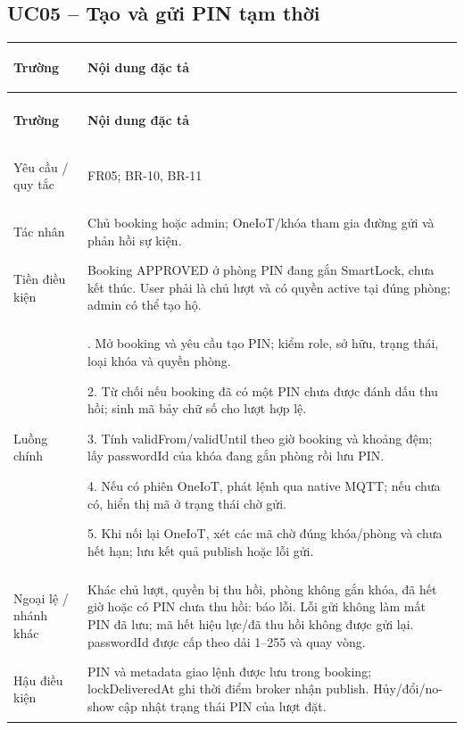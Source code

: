 \subsection{UC05 -- Tạo và gửi PIN tạm thời}\label{tab:uc05}
{\small\renewcommand{\arraystretch}{1.06}
\setlength{\tabcolsep}{6pt}\setlength{\extrarowheight}{2pt}
\renewcommand{\theHtable}{uc.\arabic{subsection}}\addtocounter{table}{-1}
\begin{longtable}{|>{\bfseries\raggedright\arraybackslash}p{3cm}|>{\raggedright\arraybackslash}p{\dimexpr\textwidth-3cm-4\tabcolsep-3\arrayrulewidth\relax}|}
\hline
\textbf{Trường} & \textbf{Nội dung đặc tả}\\\hline
\endfirsthead
\multicolumn{2}{r}{\small\itshape UC05 (tiếp)}\\
\hline
\textbf{Trường} & \textbf{Nội dung đặc tả}\\\hline
\endhead
\endlastfoot
Yêu cầu / quy tắc & FR05; BR-10, BR-11\\*\hline
Tác nhân & Chủ booking hoặc admin; OneIoT/khóa tham gia đường gửi và phản hồi sự kiện.\\*\hline
Tiền điều kiện & Booking APPROVED ở phòng PIN đang gắn SmartLock, chưa kết thúc. User phải là chủ lượt và có quyền active tại đúng phòng; admin có thể tạo hộ.\\*\hline
Luồng chính & 1. Mở booking và yêu cầu tạo PIN; kiểm role, sở hữu, trạng thái, loại khóa và quyền phòng.\par
2. Từ chối nếu booking đã có một PIN chưa được đánh dấu thu hồi; sinh mã bảy chữ số cho lượt hợp lệ.\par
3. Tính validFrom/validUntil theo giờ booking và khoảng đệm; lấy passwordId của khóa đang gắn phòng rồi lưu PIN.\par
4. Nếu có phiên OneIoT, phát lệnh qua native MQTT; nếu chưa có, hiển thị mã ở trạng thái chờ gửi.\par
5. Khi nối lại OneIoT, xét các mã chờ đúng khóa/phòng và chưa hết hạn; lưu kết quả publish hoặc lỗi gửi.\\\hline
Ngoại lệ / nhánh khác & Khác chủ lượt, quyền bị thu hồi, phòng không gắn khóa, đã hết giờ hoặc có PIN chưa thu hồi: báo lỗi. Lỗi gửi không làm mất PIN đã lưu; mã hết hiệu lực/đã thu hồi không được gửi lại. passwordId được cấp theo dải 1--255 và quay vòng.\\\hline
Hậu điều kiện & PIN và metadata giao lệnh được lưu trong booking; lockDeliveredAt ghi thời điểm broker nhận publish. Hủy/đổi/no-show cập nhật trạng thái PIN của lượt đặt.\\\hline
\end{longtable}}

